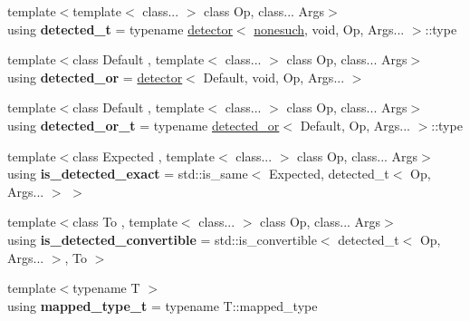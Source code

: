 \begin{DoxyCompactItemize}
\mbox{\label{namespacenlohmann_1_1detail_a37e97a32d0b94ce5f745427e4e40204d}} 
{\footnotesize template$<$template$<$ class... $>$ class Op, class... Args$>$ }\\using {\bfseries detected\+\_\+t} = typename \mbox{\hyperlink{structnlohmann_1_1detail_1_1detector}{detector}}$<$ \mbox{\hyperlink{structnlohmann_1_1detail_1_1nonesuch}{nonesuch}}, void, Op, Args... $>$\+::type
\item 
\mbox{\label{namespacenlohmann_1_1detail_a240ce21919ab08e8a6cb3a5cfa412bce}} 
{\footnotesize template$<$class Default , template$<$ class... $>$ class Op, class... Args$>$ }\\using {\bfseries detected\+\_\+or} = \mbox{\hyperlink{structnlohmann_1_1detail_1_1detector}{detector}}$<$ Default, void, Op, Args... $>$
\item 
\mbox{\label{namespacenlohmann_1_1detail_a7ac5b8ef0363101275a2827b3b117dcf}} 
{\footnotesize template$<$class Default , template$<$ class... $>$ class Op, class... Args$>$ }\\using {\bfseries detected\+\_\+or\+\_\+t} = typename \mbox{\hyperlink{structnlohmann_1_1detail_1_1detector}{detected\+\_\+or}}$<$ Default, Op, Args... $>$\+::type
\item 
\mbox{\label{namespacenlohmann_1_1detail_a7542b4dbac07817fd4849ecfa4619def}} 
{\footnotesize template$<$class Expected , template$<$ class... $>$ class Op, class... Args$>$ }\\using {\bfseries is\+\_\+detected\+\_\+exact} = std\+::is\+\_\+same$<$ Expected, detected\+\_\+t$<$ Op, Args... $>$ $>$
\item 
\mbox{\label{namespacenlohmann_1_1detail_a5262e531c46e357b33007060f294673b}} 
{\footnotesize template$<$class To , template$<$ class... $>$ class Op, class... Args$>$ }\\using {\bfseries is\+\_\+detected\+\_\+convertible} = std\+::is\+\_\+convertible$<$ detected\+\_\+t$<$ Op, Args... $>$, To $>$
\item 
\mbox{\label{namespacenlohmann_1_1detail_a9c1795c148875722f8482d39e0eb9364}} 
{\footnotesize template$<$typename T $>$ }\\using {\bfseries mapped\+\_\+type\+\_\+t} = typename T\+::mapped\+\_\+type

\end{DoxyCompactItemize}
